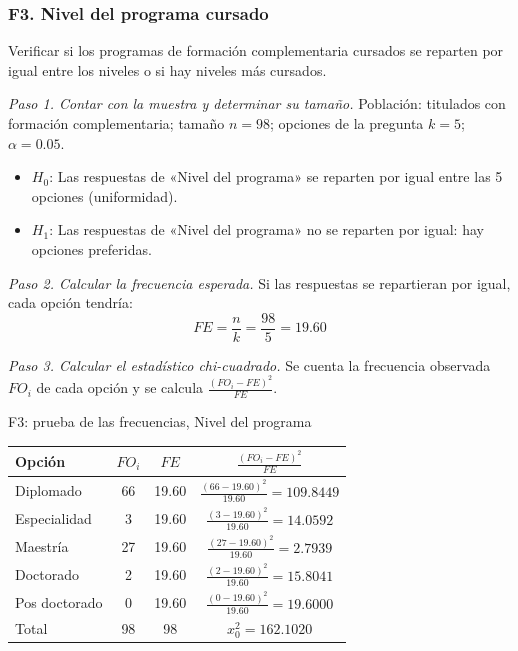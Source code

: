 \subsubsection*{F3. Nivel del programa cursado}

Verificar si los programas de formación complementaria cursados se reparten por igual entre los niveles o si hay niveles más cursados.

\textit{Paso 1. Contar con la muestra y determinar su tamaño.} Población: titulados con formación complementaria; tamaño $n = 98$; opciones de la pregunta $k = 5$; $\alpha = 0.05$.

\begin{itemize}[nosep]
  \item $H_0$: Las respuestas de «Nivel del programa» se reparten por igual entre las 5 opciones (uniformidad).
  \item $H_1$: Las respuestas de «Nivel del programa» no se reparten por igual: hay opciones preferidas.
\end{itemize}

\textit{Paso 2. Calcular la frecuencia esperada.} Si las respuestas se repartieran por igual, cada opción tendría:
\[
FE = \frac{n}{k} = \frac{98}{5} = 19.60
\]

\textit{Paso 3. Calcular el estadístico chi-cuadrado.} Se cuenta la frecuencia observada $FO_i$ de cada opción y se calcula $\frac{(FO_i - FE)^2}{FE}$.

\begin{mitabla}{F3: prueba de las frecuencias, Nivel del programa}
\begin{tabular}{L{6cm}ccc}
\toprule
Opción & $FO_i$ & $FE$ & $\frac{(FO_i-FE)^2}{FE}$ \\
\midrule
Diplomado & 66 & 19.60 & $\frac{(66-19.60)^2}{19.60} = 109.8449$ \\[3pt]
Especialidad & 3 & 19.60 & $\frac{(3-19.60)^2}{19.60} = 14.0592$ \\[3pt]
Maestría & 27 & 19.60 & $\frac{(27-19.60)^2}{19.60} = 2.7939$ \\[3pt]
Doctorado & 2 & 19.60 & $\frac{(2-19.60)^2}{19.60} = 15.8041$ \\[3pt]
Pos doctorado & 0 & 19.60 & $\frac{(0-19.60)^2}{19.60} = 19.6000$ \\[3pt]
\midrule
Total & 98 & 98 & $x_0^2 = 162.1020$ \\
\bottomrule
\end{tabular}
\end{mitabla}

